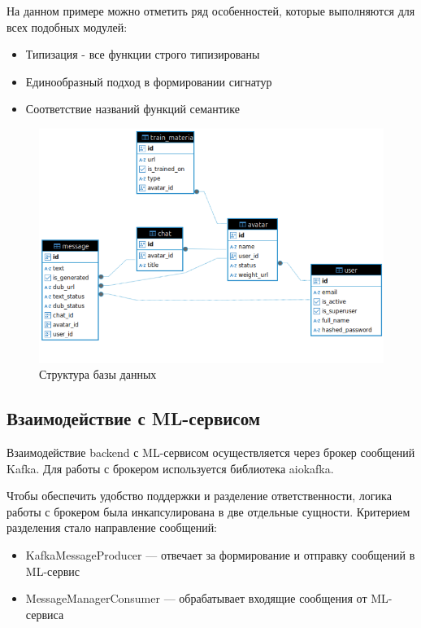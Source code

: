 На данном примере можно отметить ряд особенностей, которые выполняются для всех подобных модулей:
\begin{itemize}
    \item Типизация - все функции строго типизированы
    \item Единообразный подход в формировании сигнатур
    \item Соответствие названий функций семантике
\end{itemize}




 \begin{figure}[h!]
     \centering
     \includegraphics[width=1.0\linewidth]{images/db_structure.png}
     \caption{Структура базы данных}
     \label{fig:db_structure}
 \end{figure}



\subsection{Взаимодействие с ML-сервисом}
Взаимодействие backend с ML-сервисом осуществляется через брокер сообщений Kafka. Для работы с брокером используется библиотека aiokafka.

Чтобы обеспечить удобство поддержки и разделение ответственности, логика работы с брокером была инкапсулирована в две отдельные сущности. Критерием разделения стало направление сообщений:
\begin{itemize}
    \item KafkaMessageProducer — отвечает за формирование и отправку сообщений в ML-сервис
    \item MessageManagerConsumer — обрабатывает входящие сообщения от ML-сервиса
\end{itemize}

